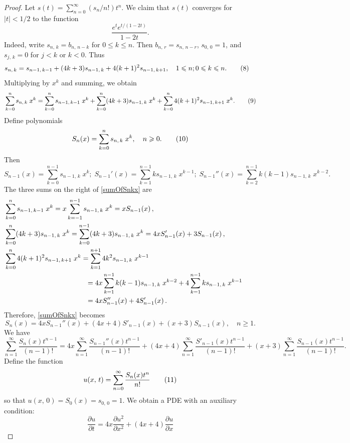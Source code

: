 \documentclass[11pt]{article}
\newcommand{\q}{\quad}
\newcommand{\ges}{\geqslant}
\newcommand{\les}{\leqslant}
\begin{document}
\begin{proof}
Let $s(t)=\sum_{n=0}^{\infty}(s_n/n!)t^n$. 
%
We claim that $s(t)$ converges for $|t|<1/2$ to the function 
\[\frac{e^te^{t/(1-2t)}}{1-2t}.\]
Indeed, write $s_{n,\,k}=b_{n,\,n-k}$ for $0\les k\les n$. Then $b_{n,\,r}=s_{n,\,n-r}$,
$s_{0,\,0}=1$, and $s_{j,\,k}=0$ for $j<k$ or $k<0$. Thus
\begin{align*}{\label{snk}}
s_{n,\,k}&=s_{n-1,\,k-1}+(4k+3)s_{n-1,\,k}+4(k+1)^2s_{n-1,\,k+1},  \q 1\les n; 0\les k\les n.\tag{8}
\end{align*}
Multiplying by $x^k$ and summing, we obtain
\[{\label{sumOfSnkx}}
\sum_{k=0}^ns_{n,\,k}\;x^k=\sum_{k=0}^ns_{n-1,\,k-1}\;x^k+\sum_{k=0}^n(4k+3)s_{n-1,\,k}\;x^k
+\sum_{k=0}^n4(k+1)^2s_{n-1,\,k+1}\;x^k.  \tag{9}
\]
Define polynomials
\[{\label{SumOfSnkx}}
S_n(x)=\sum_{k=0}^n s_{n,\,k}\;x^k,\quad n\ges 0.\tag{10}
\]
Then
\[
S_{n-1}(x)=\sum_{k=0}^{n-1}s_{n-1,\,k}\;x^k;\;
S_{n-1}'(x)=\sum_{k=1}^{n-1}ks_{n-1,\,k}\;x^{k-1};\;
S_{n-1}''(x)=\sum_{k=2}^{n-1}k(k-1)s_{n-1,\,k}\;x^{k-2}.
\]
The three sums on the right of \eqref{sumOfSnkx} are
\begin{align*}
&\sum_{k=0}^ns_{n-1,\,k-1}\;x^k=x\sum_{k=-1}^{n-1}s_{n-1,\,k}\;x^k=xS_{n-1}(x)\,,\\
&\sum_{k=0}^n(4k+3)s_{n-1,\,k}\;x^k=\sum_{k=0}^{n-1}(4k+3)s_{n-1,\,k}\;x^k=4xS'_{n-1}(x)+3S_{n-1}(x)\,,\\
&\sum_{k=0}^n4(k+1)^2s_{n-1,\,k+1}\;x^k
=\sum_{k=1}^{n+1}4k^2s_{n-1,\,k}\;x^{k-1}\\
&\hspace{4.1cm}=4x\sum_{k=1}^{n-1}k(k-1)s_{n-1,\,k}\;x^{k-2}
+4\sum_{k=1}^{n-1}ks_{n-1,\,k}\;x^{k-1}&&{}\\
&\hspace{4.1cm}=4xS''_{n-1}(x)+4S_{n-1}'(x)\,.
\end{align*}
Therefore, \eqref{sumOfSnkx} becomes
\[
S_n(x)=4xS_{n-1}''(x)+(4x+4)S'_{n-1}(x)+(x+3)S_{n-1}(x), \q n\ges 1.
\]
We have
\[
\sum_{n=1}^\infty \frac{S_n(x)t^{n-1}}{(n-1)!}=4x\sum_{n=1}^\infty \frac{S_{n-1}''(x)t^{n-1}}{(n-1)!}+(4x+4)\sum_{n=1}^\infty \frac{S'_{n-1}(x)t^{n-1}}{(n-1)!}+(x+3)\sum_{n=1}^\infty \frac{S_{n-1}(x)t^{n-1}}{(n-1)!}.
\]
Define the function
\[{\label{uxt}}
    u(x,\,t)=\sum_{n=0}^\infty \frac{S_n(x)t^n}{n!}\tag{11}
\]
so that
$u(x,\,0)=S_0(x)=s_{0,\,0}=1$.  
We obtain a PDE with an auxiliary condition:
\[
\frac{\partial u}{\partial t}=4x \frac{\partial u^2}{\partial x^2}+(4x+4)\frac{\partial u}{\partial x}
\]
\end{proof}
\end{document}
